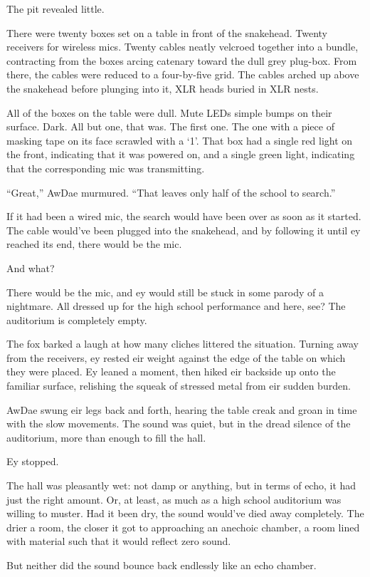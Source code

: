 The pit revealed little.

There were twenty boxes set on a table in front of the snakehead. Twenty receivers for wireless mics. Twenty cables neatly velcroed together into a bundle, contracting from the boxes arcing catenary toward the dull grey plug-box. From there, the cables were reduced to a four-by-five grid. The cables arched up above the snakehead before plunging into it, XLR heads buried in XLR nests.

All of the boxes on the table were dull. Mute LEDs simple bumps on their surface. Dark. All but one, that was. The first one. The one with a piece of masking tape on its face scrawled with a `1'. That box had a single red light on the front, indicating that it was powered on, and a single green light, indicating that the corresponding mic was transmitting.

``Great,'' AwDae murmured. ``That leaves only half of the school to search.''

If it had been a wired mic, the search would have been over as soon as it started. The cable would've been plugged into the snakehead, and by following it until ey reached its end, there would be the mic.

And what?

There would be the mic, and ey would still be stuck in some parody of a nightmare. All dressed up for the high school performance and here, see? The auditorium is completely empty.

The fox barked a laugh at how many cliches littered the situation. Turning away from the receivers, ey rested eir weight against the edge of the table on which they were placed. Ey leaned a moment, then hiked eir backside up onto the familiar surface, relishing the squeak of stressed metal from eir sudden burden.

AwDae swung eir legs back and forth, hearing the table creak and groan in time with the slow movements. The sound was quiet, but in the dread silence of the auditorium, more than enough to fill the hall.

Ey stopped.

The hall was pleasantly wet: not damp or anything, but in terms of echo, it had just the right amount. Or, at least, as much as a high school auditorium was willing to muster. Had it been dry, the sound would've died away completely. The drier a room, the closer it got to approaching an anechoic chamber, a room lined with material such that it would reflect zero sound.

But neither did the sound bounce back endlessly like an echo chamber.


